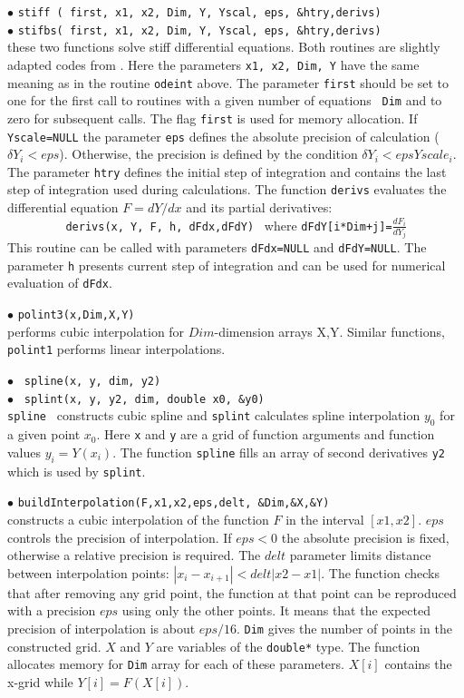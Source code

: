 \documentclass[12pt,a4paper]{article}
\begin{document}
\noindent$\bullet$ \verb|stiff ( first, x1, x2, Dim, Y, Yscal, eps, &htry,derivs)|\\
\noindent$\bullet$ \verb|stifbs( first, x1, x2, Dim, Y, Yscal, eps, &htry,derivs)|\\
these two functions solve  stiff  differential
equations. Both routines  are slightly adapted codes from
\cite{Numerical}. Here the parameters  {\tt x1, x2, Dim, Y} have the same
meaning as in the routine  {\tt odeint}  above. The parameter {\tt first}
should be set to one for the first call to routines with a given number of equations {\tt
Dim} and to zero for subsequent calls.  The flag {\tt first} is used for memory allocation.  If {\tt Yscale=NULL}  the parameter
{\tt eps} defines the absolute precision of calculation ($\delta Y_i < eps$).  Otherwise, the
precision is defined by the  condition $\delta Y_i < eps Yscale_i$. 
The parameter {\tt htry} defines the initial step of integration and contains the last step of
integration used during  calculations.
The function {\tt derivs} evaluates the differential equation
$F= dY/dx$  and its partial derivatives:\\  
\verb|         derivs(x, Y, F, h, dFdx,dFdY) | where
\verb|dFdY[i*Dim+j]=|$\frac{dF_i}{dY_j}$\\
This routine can
be called with parameters {\tt dFdx=NULL} and  {\tt dFdY=NULL}. The  parameter
{\tt h} presents current step of integration and can be used for numerical
evaluation of  {\tt dFdx}. 


\noindent$\bullet$ \verb|polint3(x,Dim,X,Y)|\\
performs   cubic interpolation for $Dim$-dimension arrays X,Y. Similar 
functions, \verb|polint1|  performs linear interpolations.

\noindent$\bullet$ \verb| spline(x, y, dim, y2)|\\
\noindent$\bullet$ \verb| splint(x, y, y2, dim, double x0, &y0)|\\
{\tt spline } constructs cubic  spline and {\tt splint} calculates spline
interpolation $y_0$  for a given point $x_0$. Here  {\tt x} and {\tt y} are a 
grid of function arguments and function values $ y_i= Y(x_i)$. The 
function {\tt spline} fills   an array of second  derivatives {\tt y2} which is 
used by  {\tt splint}.
   

\noindent$\bullet$ \verb|buildInterpolation(F,x1,x2,eps,delt, &Dim,&X,&Y)|\\
constructs  a cubic interpolation of the function $F$ in the interval $[x1,x2]$.
$eps$ controls the precision of interpolation. If $eps < 0$ the absolute 
precision is fixed, otherwise a relative precision is required.
The $delt$ parameter limits distance between  interpolation points: $|x_i
-x_{i+1}|<delt|x2-x1|$.  
The function checks that after removing any grid point, the function at that point
can be reproduced with a precision $eps$ using only the other points.  It means that
the expected precision of interpolation is about $eps/16$. \verb|Dim| gives the number 
of points in the  constructed grid. $X$ and $Y$ are variables of the  
\verb|double*| type. The function allocates memory for \verb|Dim| array for each 
 of these parameters. $X[i]$ contains the x-grid while $Y[i]=F(X[i])$.
\end{document}
